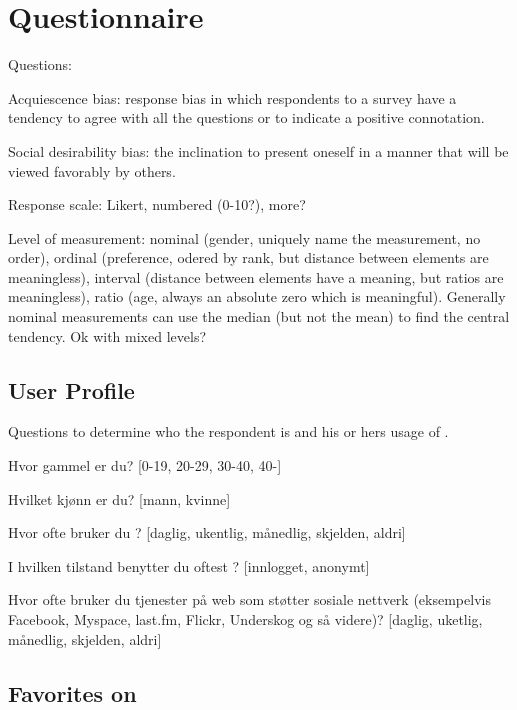 \chapter{Questionnaire}
\label{appendix:questionnaire}

Questions:

\begin{items}
  \item Acquiescence bias: response bias in which respondents
    to a survey have a tendency to agree with all the questions or to indicate
    a positive connotation.
  \item Social desirability bias: the inclination to present oneself in a
    manner that will be viewed favorably by others.
  \item Response scale: Likert, numbered (0-10?), more?
  \item Level of measurement: nominal (gender, uniquely name the measurement,
    no order), ordinal (preference, odered by rank, but distance between
    elements are meaningless), interval (distance between elements have a
    meaning, but ratios are meaningless), ratio (age, always an absolute zero
    which is meaningful). Generally nominal measurements can use the median
    (but not the mean) to find the central tendency.
    Ok with mixed levels?
\end{items}

\section{User Profile}

Questions to determine who the respondent is and his or hers usage of
\urort{}.

\begin{items}
  \item Hvor gammel er du? [0-19, 20-29, 30-40, 40-]
  \item Hvilket kjønn er du? [mann, kvinne]
  \item Hvor ofte bruker du \urort{}?
    [daglig, ukentlig, månedlig, skjelden, aldri]
  \item I hvilken tilstand benytter du oftest \urort{}? [innlogget, anonymt]
  \item Hvor ofte bruker du tjenester på web som støtter sosiale
    nettverk (eksempelvis Facebook, Myspace, last.fm, Flickr, Underskog
    og så videre)?
    [daglig, uketlig, månedlig, skjelden, aldri]
\end{items}

\section{Favorites on \urort{}}

